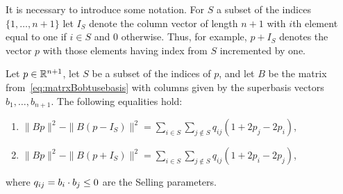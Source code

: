 \documentclass[final,leqno]{siamltex}
\begin{document}
\newcommand{\rng}{\operatorname{rng}}
\newcommand{\subrng}{\operatorname{subr}}
\newcommand{\decrng}{\operatorname{decrng}}

It is necessary to introduce some notation.  For $S$ a subset of the indices $\{1,\dots,n+1\}$ let $I_S$ denote the column vector of length $n+1$ with $i$th element equal to one if $i \in S$ and $0$ otherwise. Thus, for example, $p+I_S$ denotes the vector $p$ with those elements having index from $S$ incremented by one.

\begin{lemma}\label{lem:decSellings}
Let $p \in {\mathbb R}^{n+1}$, let $S$ be a subset of the indices of $p$, and let $B$ be the matrix from~\eqref{eq:matrxBobtusebasis} with columns given by the superbasis vectors $b_1,\dots,b_{n+1}$.  The following equalities hold:
\begin{enumerate}
\item  ${\displaystyle \|Bp\|^2 - \|B(p - I_S)\|^2 = \sum_{i \in S}\sum_{j \notin S}q_{ij}(1 + 2p_j - 2p_i)}$, \label{eq:lem:decSellingsdec}
\item  ${\displaystyle \|Bp\|^2 - \|B(p + I_S)\|^2 = \sum_{i \in S}\sum_{j \notin S}q_{ij}(1 + 2p_i - 2p_j)}$, \label{eq:lem:decSellingsinc}
\end{enumerate}
where $q_{ij} = b_i \cdot b_j \leq 0$ are the Selling parameters.
\end{lemma}
\end{document}
